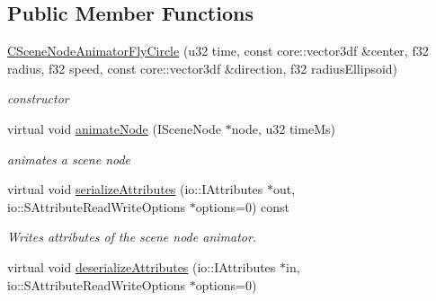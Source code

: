 \subsection*{Public Member Functions}
\begin{DoxyCompactItemize}
\item 
\hypertarget{classirr_1_1scene_1_1_c_scene_node_animator_fly_circle_a07822612b88002d59f7fc790c6f995cc}{\hyperlink{classirr_1_1scene_1_1_c_scene_node_animator_fly_circle_a07822612b88002d59f7fc790c6f995cc}{C\-Scene\-Node\-Animator\-Fly\-Circle} (u32 time, const core\-::vector3df \&center, f32 radius, f32 speed, const core\-::vector3df \&direction, f32 radius\-Ellipsoid)}\label{classirr_1_1scene_1_1_c_scene_node_animator_fly_circle_a07822612b88002d59f7fc790c6f995cc}

\begin{DoxyCompactList}\small\item\em constructor \end{DoxyCompactList}\item 
\hypertarget{classirr_1_1scene_1_1_c_scene_node_animator_fly_circle_a9c31a30969ece04ec58f0f9ed9f19b2d}{virtual void \hyperlink{classirr_1_1scene_1_1_c_scene_node_animator_fly_circle_a9c31a30969ece04ec58f0f9ed9f19b2d}{animate\-Node} (I\-Scene\-Node $\ast$node, u32 time\-Ms)}\label{classirr_1_1scene_1_1_c_scene_node_animator_fly_circle_a9c31a30969ece04ec58f0f9ed9f19b2d}

\begin{DoxyCompactList}\small\item\em animates a scene node \end{DoxyCompactList}\item 
\hypertarget{classirr_1_1scene_1_1_c_scene_node_animator_fly_circle_a37fd63bd5e8250adcfe52a695641556b}{virtual void \hyperlink{classirr_1_1scene_1_1_c_scene_node_animator_fly_circle_a37fd63bd5e8250adcfe52a695641556b}{serialize\-Attributes} (io\-::\-I\-Attributes $\ast$out, io\-::\-S\-Attribute\-Read\-Write\-Options $\ast$options=0) const }\label{classirr_1_1scene_1_1_c_scene_node_animator_fly_circle_a37fd63bd5e8250adcfe52a695641556b}

\begin{DoxyCompactList}\small\item\em Writes attributes of the scene node animator. \end{DoxyCompactList}\item 
\hypertarget{classirr_1_1scene_1_1_c_scene_node_animator_fly_circle_a6c94d815127f3aeaf12c25e040a706ea}{virtual void \hyperlink{classirr_1_1scene_1_1_c_scene_node_animator_fly_circle_a6c94d815127f3aeaf12c25e040a706ea}{deserialize\-Attributes} (io\-::\-I\-Attributes $\ast$in, io\-::\-S\-Attribute\-Read\-Write\-Options $\ast$options=0)}\label{classirr_1_1scene_1_1_c_scene_node_animator_fly_circle_a6c94d815127f3aeaf12c25e040a706ea}


\end{DoxyCompactItemize}
